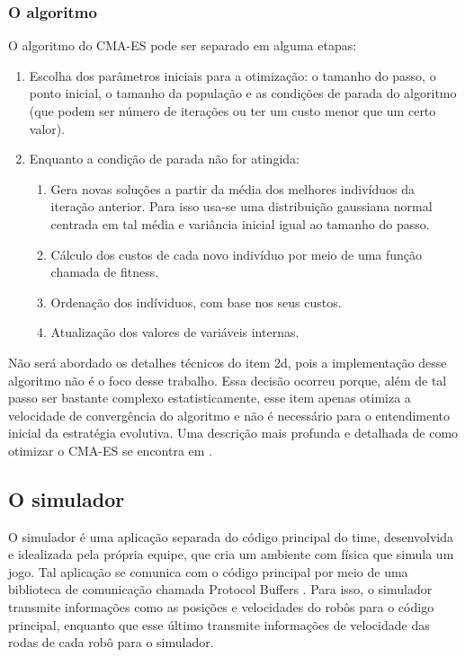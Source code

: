 \documentclass[a4paper,12pt]{article}
\begin{document}
\subsubsection{O algoritmo}

O algoritmo do CMA-ES pode ser separado em alguma etapas:

\begin{enumerate}
\item Escolha dos parâmetros iniciais para a otimização: o tamanho do passo, o ponto inicial, o tamanho da população e as condições de parada do algoritmo (que podem ser número de iterações ou ter um custo menor que um certo valor).
\item Enquanto a condição de parada não for atingida:
\begin{enumerate}
\item Gera novas soluções a partir da média dos melhores indivíduos da iteração anterior. Para isso usa-se uma distribuição gaussiana normal centrada em tal média e variância inicial igual ao tamanho do passo.
\item Cálculo dos custos de cada novo indivíduo por meio de uma função chamada de fitness.
\item Ordenação dos indíviduos, com base nos seus custos.
\item Atualização dos valores de variáveis internas.
\end{enumerate}
\end{enumerate}

Não será abordado os detalhes técnicos do item 2d, pois a implementação desse algoritmo não é o foco desse trabalho. Essa decisão ocorreu porque, além de tal passo ser bastante complexo estatisticamente, esse item apenas otimiza a velocidade de convergência do algoritmo e não é necessário para o entendimento inicial da estratégia evolutiva. Uma descrição mais profunda e detalhada de como otimizar o CMA-ES se encontra em \cite{CMA-ES}.

\subsection{O simulador}

O simulador é uma aplicação separada do código principal do time, desenvolvida e idealizada pela própria equipe, que cria um ambiente com física que simula um jogo. Tal aplicação se comunica com o código principal por meio de uma biblioteca de comunicação chamada Protocol Buffers \cite{protobuf}. Para isso, o simulador transmite informações como as posições e velocidades do robôs para o código principal, enquanto que esse último transmite informações de velocidade das rodas de cada robô para o simulador.
\end{document}
